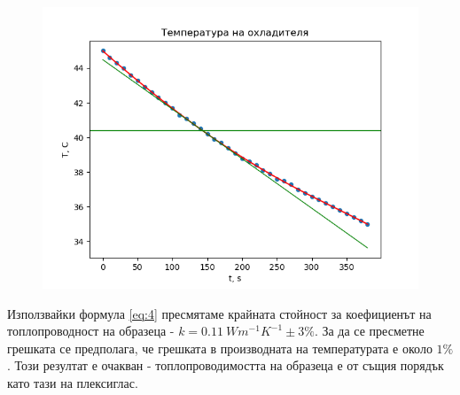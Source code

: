 \documentclass[reprint,amsmath,amssymb,aps]{revtex4-2}
\begin{document}
\begin{figure}[ht]
    \centering
    \includegraphics[width=\columnwidth, keepaspectratio=true]{graph_cool.png}
    \caption{} 
    \label{fig:2}
\end{figure}

Използвайки формула \eqref{eq:4} пресмятаме крайната стойност за коефициенът на топлопроводност на образеца - $k = 0.11 \ \si{Wm^{-1}K^{-1}} \pm 3\%$.  За да се пресметне грешката се предполага, че грешката в производната на температурата е около $1\%$. Този резултат е очакван - топлопроводимостта на образеца е от същия порядък като тази на плексиглас. 
\end{document}
